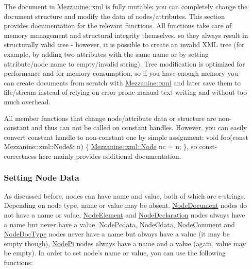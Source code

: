 The document in \hyperlink{namespaceMezzanine_1_1xml}{Mezzanine::xml} is fully mutable: you can completely change the document structure and modify the data of nodes/attributes. This section provides documentation for the relevant functions. All functions take care of memory management and structural integrity themselves, so they always result in structurally valid tree -\/ however, it is possible to create an invalid XML tree (for example, by adding two attributes with the same name or by setting attribute/node name to empty/invalid string). Tree modification is optimized for performance and for memory consumption, so if you have enough memory you can create documents from scratch with \hyperlink{namespaceMezzanine_1_1xml}{Mezzanine::xml} and later save them to file/stream instead of relying on error-\/prone manual text writing and without too much overhead. \par
 \par
 All member functions that change node/attribute data or structure are non-\/constant and thus can not be called on constant handles. However, you can easily convert constant handle to non-\/constant one by simple assignment: void foo(const Mezzanine::xml::Node\& n) \{ \hyperlink{classMezzanine_1_1xml_1_1Node}{Mezzanine::xml::Node} nc = n; \}, so const-\/correctness here mainly provides additional documentation. \par
 \par
 \hypertarget{XMLManual_XMLModifyingNodeData}{}\subsubsection{Setting Node Data}\label{XMLManual_XMLModifyingNodeData}
As discussed before, nodes can have name and value, both of which are c-\/strings. Depending on node type, name or value may be absent. \hyperlink{namespaceMezzanine_1_1xml_a524d867e34ff408b8f45a51b7924cb80}{NodeDocument} nodes do not have a name or value, \hyperlink{namespaceMezzanine_1_1xml_a524d867e34ff408b8f45a51b7924cb80}{NodeElement} and \hyperlink{namespaceMezzanine_1_1xml_a524d867e34ff408b8f45a51b7924cb80}{NodeDeclaration} nodes always have a name but never have a value, \hyperlink{namespaceMezzanine_1_1xml_a524d867e34ff408b8f45a51b7924cb80}{NodePcdata}, \hyperlink{namespaceMezzanine_1_1xml_a524d867e34ff408b8f45a51b7924cb80}{NodeCdata}, \hyperlink{namespaceMezzanine_1_1xml_a524d867e34ff408b8f45a51b7924cb80}{NodeComment} and \hyperlink{namespaceMezzanine_1_1xml_a524d867e34ff408b8f45a51b7924cb80}{NodeDocType} nodes never have a name but always have a value (it may be empty though), \hyperlink{namespaceMezzanine_1_1xml_a524d867e34ff408b8f45a51b7924cb80}{NodePi} nodes always have a name and a value (again, value may be empty). In order to set node's name or value, you can use the following functions: 
